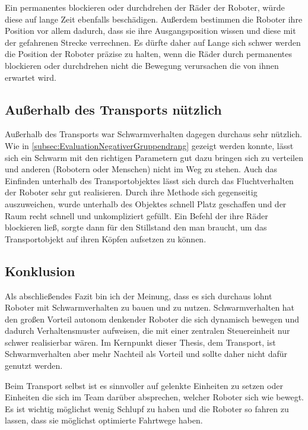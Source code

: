 Ein permanentes blockieren oder durchdrehen der Räder der Roboter, würde diese auf lange Zeit ebenfalls beschädigen. Außerdem bestimmen die Roboter ihre Position vor allem dadurch, dass sie ihre Ausgangsposition wissen und diese mit der gefahrenen Strecke verrechnen. Es dürfte daher auf Lange sich schwer werden die Position der Roboter präzise zu halten, wenn die Räder durch permanentes blockieren oder durchdrehen nicht die Bewegung verursachen die von ihnen erwartet wird.



\subsection*{Außerhalb des Transports nützlich}
Außerhalb des Transports war Schwarmverhalten dagegen durchaus sehr nützlich. Wie in \autoref{subsec:EvaluationNegativerGruppendrang} gezeigt werden konnte, lässt sich ein Schwarm mit den richtigen Parametern gut dazu bringen sich zu verteilen und anderen (Robotern oder Menschen) nicht im Weg zu stehen. Auch das Einfinden unterhalb des Transportobjektes lässt sich durch das Fluchtverhalten der Roboter sehr gut realisieren. Durch ihre Methode sich gegenseitig auszuweichen, wurde unterhalb des Objektes schnell Platz geschaffen und der Raum recht schnell und unkompliziert gefüllt. Ein Befehl der ihre Räder blockieren ließ, sorgte dann für den Stillstand den man braucht, um das Transportobjekt auf ihren Köpfen aufsetzen zu können.



\subsection*{Konklusion}
Als abschließendes Fazit bin ich der Meinung, dass es sich durchaus lohnt Roboter mit Schwarmverhalten zu bauen und zu nutzen. Schwarmverhalten hat den großen Vorteil autonom denkender Roboter die sich dynamisch bewegen und dadurch Verhaltensmuster aufweisen, die mit einer zentralen Steuereinheit nur schwer realisierbar wären. Im Kernpunkt dieser Thesis, dem Transport, ist Schwarmverhalten aber mehr Nachteil als Vorteil und sollte daher nicht dafür genutzt werden.

Beim Transport selbst ist es sinnvoller auf gelenkte Einheiten zu setzen oder Einheiten die sich im Team darüber absprechen, welcher Roboter sich wie bewegt. Es ist wichtig möglichst wenig Schlupf zu haben und die Roboter so fahren zu lassen, dass sie möglichst optimierte Fahrtwege haben.

